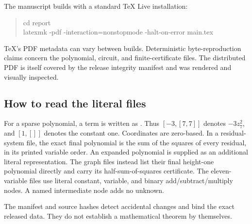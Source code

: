 The manuscript builds with a standard TeX Live installation:
\begin{quote}\ttfamily
cd report\\
latexmk -pdf -interaction=nonstopmode -halt-on-error main.tex
\end{quote}
TeX's PDF metadata can vary between builds. Deterministic byte-reproduction
claims concern the polynomial, circuit, and finite-certificate files. The
distributed PDF is itself covered by the release integrity manifest and was
rendered and visually inspected.

\subsection{How to read the literal files}
For a sparse polynomial, a term is written as
\file{[coefficient, [indices]]}. Thus $[-3,[7,7]]$ denotes $-3z_7^2$,
and $[1,[]]$ denotes the constant one. Coordinates are zero-based.
In a residual-system file, the exact final polynomial is the sum of the squares
of every residual, in its printed variable order. An expanded polynomial is
supplied as an additional literal representation. The graph files instead list
their final height-one polynomial directly and carry its half-sum-of-squares
certificate. The eleven-variable files use literal constant, variable, and
binary add/subtract/multiply nodes. A named intermediate node adds no unknown.

The manifest and source hashes detect accidental changes and bind the exact
released data. They do not establish a mathematical theorem by themselves.
